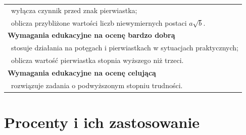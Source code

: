 \documentclass[12pt,a4paper]{article}
\begin{document}
\begin{longtable}{|p{16cm}|}
		\textbullet\ wyłącza czynnik przed znak pierwiastka; \\
		
		\textbullet\ oblicza przybliżone wartości liczb niewymiernych postaci $a\sqrt{b}$. \\ \hline
		
		\textbf{Wymagania edukacyjne na ocenę bardzo dobrą} \\ \hline
		
		\textbullet\ stosuje działania na potęgach i pierwiastkach w sytuacjach praktycznych; \\
		
		\textbullet\ oblicza wartość pierwiastka stopnia wyższego niż trzeci. \\ \hline
		
		\textbf{Wymagania edukacyjne na ocenę celującą} \\ \hline
		
		\textbullet\ rozwiązuje zadania o podwyższonym stopniu trudności. \\ \hline
		
	\end{longtable}
	
	\section{Procenty i ich zastosowanie}
	
\end{document}
